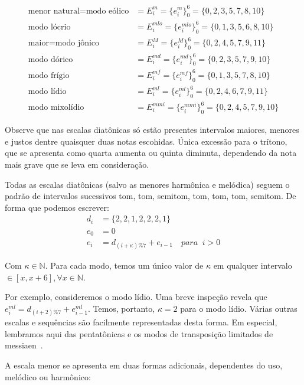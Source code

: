 \begin{equation}
\begin{split}
\text{menor natural} = \text{modo eólico} & = E_i^m = \{e_i^m\}_0^6 = \{0,2,3,5,7,8,10\} \\
\text{modo lócrio} & = E_i^{mlo} = \{e_i^{mlo}\}_0^6 = \{0,1,3,5,6,8,10\} \\ 
\text{maior}  = \text{modo jônico} & = E_i^M = \{e_i^M\}_0^6 = \{0,2,4,5,7,9,11\} \\
\text{modo dórico} & = E_i^{md} = \{e_i^{md}\}_0^6 = \{0,2,3,5,7,9,10\} \\
\text{modo frígio} & = E_i^{mf} = \{e_i^{mf}\}_0^6 = \{0,1,3,5,7,8,10\} \\
\text{modo lídio} & = E_i^{ml}=\{e_i^{ml}\}_0^6 = \{0,2,4,6,7,9,11\} \\
\text{modo mixolídio} & = E_i^{mmi} = \{e_i^{mmi}\}_0^6 = \{0,2,4,5,7,9,10\}
\end{split}
\end{equation}

Observe que nas escalas diatônicas só estão presentes intervalos maiores, menores e justos dentre quaisquer duas notas escohidas. Única excessão para o trítono, que se apresenta como quarta aumenta ou quinta diminuta, dependendo da nota mais grave que se leva em consideração.

Todas as escalas diatônicas (salvo as menores harmônica e melódica)
seguem o padrão de intervalos sucessivos
tom, tom, semitom, tom, tom, tom, semitom. De forma
que podemos escrever:
\begin{equation}
\begin{split}
d_i & =\{2,2,1,2,2,2,1\} \\
e_0 & =0 \\
e_i & =d_{(i+\kappa)\%7}+e_{i-1} \quad para \;\;  i > 0
\end{split}
\end{equation}

Com $\kappa \in \mathbb{N}$. Para cada
modo, temos um único valor de $\kappa$ em qualquer intervalo $\in [x,x+6], \forall x \in \mathbb{N}$.


Por exemplo, consideremos o modo lídio. Uma breve
inspeção revela que $e_i^{ml}=d_{(i+2)\%7}+e_{i-1}^{ml}$. Temos, portanto, $\kappa=2$
para o modo lídio. 
Várias outras escalas e sequências são facilmente representadas desta forma. Em especial,
lembramos aqui das pentatônicas e os modos de transposição limitados de messiaen~\cite{Messiaen}.

A escala menor se apresenta em duas formas adicionais, dependentes do uso, melódico ou harmônico:

